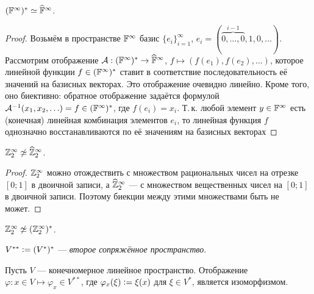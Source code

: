 \begin{proposal}
    $(\mathbb{F}^\infty)^\ast \simeq \widehat{\mathbb{F}}^\infty$.
\end{proposal}

\begin{proof}
    Возьмём в пространстве $\mathbb{F}^\infty$ базис $\{e_i\}_{i = 1}^\infty$, $e_i = (\overbrace{0, \ldots, 0}^{i - 1}, 1, 0, \ldots)$. Рассмотрим отображение $\mathcal{A}: (\mathbb{F}^\infty)^\ast \to \widehat{\mathbb{F}}^\infty$, $f \mapsto (f(e_1), f(e_2), \ldots)$, которое линейной функции $f \in (\mathbb{F}^\infty)^\ast$ ставит в соответствие последовательность её значений на базисных векторах. Это отображение очевидно линейно. Кроме того, оно биективно: обратное отображение задаётся формулой $\mathcal{A}^{-1}(x_1, x_2, \ldots) = f \in (\mathbb{F}^\infty)^\ast$, где $f(e_i) = x_i$. Т.\,к. любой элемент $y \in \mathbb{F}^\infty$ есть (конечная) линейная комбинация элементов $e_i$, то линейная функция $f$ однозначно восстанавливаются по её значениям на базисных векторах
\end{proof}

\begin{proposal}
    $\mathbb{Z}_2^\infty \not\simeq \widehat{\mathbb{Z}}_2^\infty$.
\end{proposal}

\begin{proof}
    $\mathbb{Z}_2^\infty$ можно отождествить с множеством рациональных чисел на отрезке $[0; 1]$ в двоичной записи, а $\widehat{\mathbb{Z}}_2^\infty$ --- с множеством вещественных чисел на $[0; 1]$ в двоичной записи. Поэтому биекции между этими множествами быть не может.
\end{proof}

\begin{corollary}
    $\mathbb{Z}_2^\infty \not\simeq (\mathbb{Z}_2^\infty)^\ast$.
\end{corollary}

\begin{definition}
    $V^{\ast\ast} \vcentcolon= (V^\ast)^\ast$ --- \textit{второе сопряжённое пространство}.
\end{definition}

\begin{theorem}
    Пусть $V$ --- конечномерное линейное пространство. Отображение $\varphi: x \in V \mapsto \varphi_x \in V^{\ast\ast}$, где $\varphi_x(\xi) \vcentcolon = \xi(x)$ для $\xi \in V^\ast$, является изоморфизмом.
\end{theorem}

